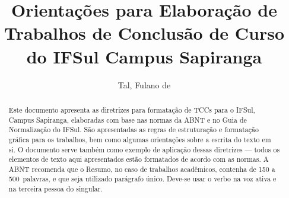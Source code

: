 \documentclass{ifsultcc}
\author{Tal, Fulano de}
\title{Orientações para Elaboração de Trabalhos de Conclusão de Curso
do IFSul Campus Sapiranga}
\begin{document}
\capa
\folhaderosto

%



%
\begin{abstract}
Este documento apresenta as diretrizes para formatação de TCCs para o IFSul, Campus Sapiranga, elaboradas com base nas normas da ABNT e no Guia de Normalização do IFSul.  São apresentadas as regras de estruturação e formatação gráfica para os trabalhos, bem como algumas orientações sobre a escrita do texto em si.  O documento serve também como exemplo de aplicação dessas diretrizes --- todos os elementos de texto aqui apresentados estão formatados de acordo com as normas.  A ABNT recomenda que o Resumo, no caso de trabalhos acadêmicos, contenha de 150 a 500~palavras, e que seja utilizado parágrafo único. Deve-se usar o verbo na voz ativa e na terceira pessoa do singular.
\end{abstract}
\end{document}
